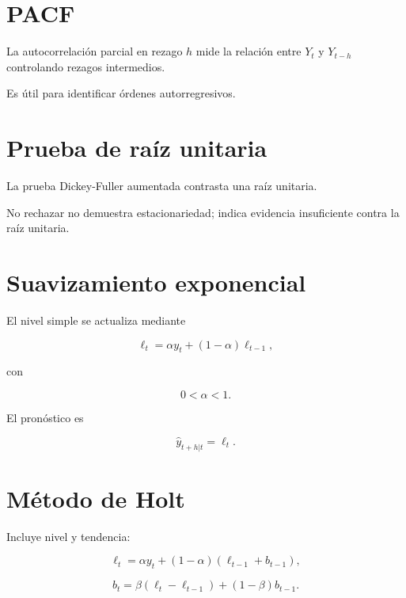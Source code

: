 \documentclass[
  spanish,
  10.5pt,
  letterpaper,
  DIV=11,
  numbers=noendperiod,
  oneside,
  open=any]{scrreprt}
\theoremstyle{definition}
\theoremstyle{definition}
\theoremstyle{plain}
\theoremstyle{remark}
\begin{document}
\section*{PACF}\label{pacf}


La autocorrelación parcial en rezago \(h\) mide la relación entre
\(Y_t\) y \(Y_{t-h}\) controlando rezagos intermedios.

Es útil para identificar órdenes autorregresivos.

\section*{Prueba de raíz unitaria}\label{prueba-de-rauxedz-unitaria}


La prueba Dickey-Fuller aumentada contrasta una raíz unitaria.

No rechazar no demuestra estacionariedad; indica evidencia insuficiente
contra la raíz unitaria.

\section*{Suavizamiento exponencial}\label{suavizamiento-exponencial}


El nivel simple se actualiza mediante

\[
\ell_t
=
\alpha y_t+(1-\alpha)\ell_{t-1},
\]

con

\[
0<\alpha<1.
\]

El pronóstico es

\[
\widehat{y}_{t+h|t}=\ell_t.
\]

\section*{Método de Holt}\label{muxe9todo-de-holt}


Incluye nivel y tendencia:

\[
\ell_t
=
\alpha y_t
+
(1-\alpha)(\ell_{t-1}+b_{t-1}),
\]

\[
b_t
=
\beta(\ell_t-\ell_{t-1})
+
(1-\beta)b_{t-1}.
\]
\end{document}

